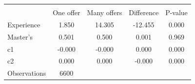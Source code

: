 {
\def\sym#1{\ifmmode^{#1}\else\(^{#1}\)\fi}
\begin{tabular}{l*{1}{S S S S}}
\toprule
                &                   \\
                &One offer&Many offers&Difference&  P-value\\
\midrule
Experience      &    1.850&   14.305&  -12.455&    0.000\\
Master's        &    0.501&    0.500&    0.001&    0.969\\
c1              &   -0.000&   -0.000&    0.000&    0.000\\
c2              &    0.000&    0.000&   -0.000&    0.000\\
\midrule
Observations    &     6600&         &         &         \\
\bottomrule
\end{tabular}
}

